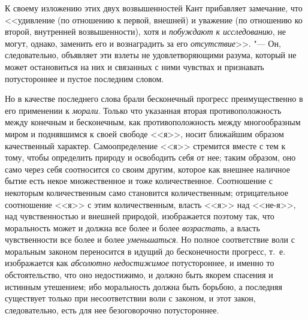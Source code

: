 К своему изложению этих двух возвышенностей Кант прибавляет замечание, что
<<удивление (по отношению к первой, внешней) и уважение (по отношению ко
второй, внутренней возвышенности), хотя и
{\em побуждают к исследованию}, не могут, однако,
заменить его и вознаградить за его
{\em отсутствие}>>. "--- Он, следовательно, объявляет эти взлеты не
удовлетворяющими разума, который не может остановиться на них и связанных с
ними чувствах и признавать потустороннее и пустое последним словом.

Но в качестве последнего слова брали бесконечный прогресс преимущественно в
его применении к {\em морали}. Только что указанная
вторая противоположность между конечным и бесконечным, как
противоположность между многообразным миром и поднявшимся к своей свободе
<<я>>, носит ближайшим образом качественный характер. Самоопределение <<я>>
стремится вместе с тем к тому, чтобы определить природу и освободить себя
от нее; таким образом, оно само через себя соотносится со своим другим,
которое как внешнее наличное бытие есть некое множественное и тоже
количественное. Соотношение с некоторым количественным само становится
количественным; отрицательное соотношение <<я>> с этим количественным, власть
<<я>> над <<не-я>>, над чувственностью и внешней природой, изображается поэтому
так, что моральность может и должна все более и более
{\em возрастать}, а власть чувственности все более и
более {\em уменьшаться}. Но полное соответствие воли с
моральным законом переносится в идущий до бесконечности прогресс, т.~е.
изображается как {\em абсолютно недостижимое}
потустороннее, и именно то обстоятельство, что оно недостижимо, и должно
быть якорем спасения и истинным утешением; ибо моральность должна быть
борьбою, а последняя существует только при несоответствии воли с законом, и
этот закон, следовательно, есть для нее безоговорочно потустороннее.


